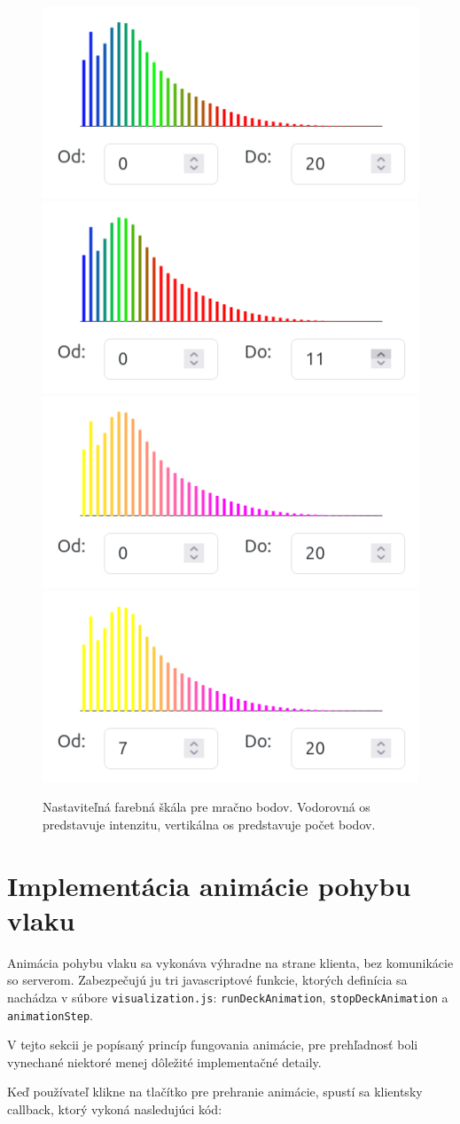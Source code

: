 \begin{figure}[h]
    \centering
    \includegraphics[width=0.35\linewidth]{text_prace/obrazky-figures/farebna_skala1.png}
    \includegraphics[width=0.35\linewidth]{text_prace/obrazky-figures/farebna_skala2.png}
    \includegraphics[width=0.35\linewidth]{text_prace/obrazky-figures/farebna_skala3.png}
    \includegraphics[width=0.35\linewidth]{text_prace/obrazky-figures/farebna_skala4.png}
    \caption{Nastaviteľná farebná škála pre mračno bodov. Vodorovná os predstavuje intenzitu, vertikálna os predstavuje počet bodov.}
    \label{fig:farebna_skala}
\end{figure}

\section{Implementácia animácie pohybu vlaku}
\label{sec:implementacia_animacie}

Animácia pohybu vlaku sa vykonáva výhradne na strane klienta, bez komunikácie so serverom. Zabezpečujú ju tri javascriptové funkcie, ktorých definícia sa nachádza v súbore \texttt{visualization.js}: \texttt{runDeckAnimation}, \texttt{stopDeckAnimation} a \texttt{animationStep}.

V tejto sekcii je popísaný princíp fungovania animácie, pre prehľadnosť boli vynechané niektoré menej dôležité implementačné detaily.

Keď používateľ klikne na tlačítko pre prehranie animácie, spustí sa klientsky callback, ktorý vykoná nasledujúci kód:

